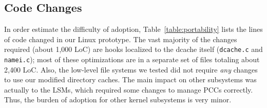 

\subsection{Code Changes}

In order estimate the difficulty of adoption, Table~\ref{table:portability} lists the lines of code changed in our Linux prototype.
The vast majority of the changes required (about 1,000 LoC)
are hooks localized to the dcache itself ({\tt dcache.c} and {\tt namei.c});
most of these optimizations are in a separate set of files totaling about 2,400 LoC.
Also, the low-level file systems we tested did not require {\em any} changes to use our modified directory caches.
The main impact on other subsystems was actually to the LSMs, which required some changes
to manage PCCs correctly. %
Thus, the burden of adoption for other kernel subsystems is very minor.

